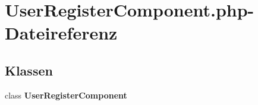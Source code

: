 \section{UserRegisterComponent.php-Dateireferenz}
\label{UserRegisterComponent_8php}
\subsection*{Klassen}
\begin{CompactItemize}
\item 
class {\bf UserRegisterComponent}
\end{CompactItemize}
